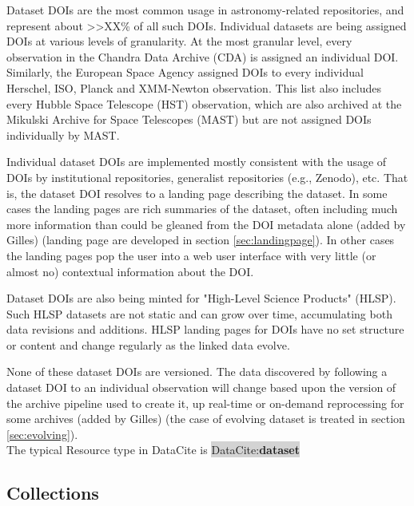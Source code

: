 \documentclass[11pt,a4paper]{ivoa}
\newcommand{\dataciteterm}[1]{\colorbox{lightgray}{DataCite:\textbf{#1}}}
\begin{document}
Dataset DOIs are the most common usage in astronomy-related repositories, and represent about >>XX\% of all such DOIs.
Individual datasets are being assigned DOIs at various levels of granularity. 
At the most granular level, every observation in the Chandra Data Archive (CDA) is assigned an individual DOI.
Similarly, the European Space Agency assigned DOIs to every individual Herschel, ISO, Planck and XMM-Newton observation. 
This list also includes every Hubble Space Telescope (HST) observation, which are also archived at the Mikulski Archive for Space Telescopes (MAST) but are not assigned DOIs individually by MAST.

Individual dataset DOIs are implemented mostly consistent with the usage of DOIs by institutional repositories, generalist repositories (e.g., Zenodo), etc.
That is, the dataset DOI resolves to a landing page describing the dataset.
In some cases the landing pages are rich summaries of the dataset, often including much more information than could be gleaned from the DOI metadata alone {\color{red}(added by Gilles) (landing page are developed in section \ref{sec:landingpage})}.
In other cases the landing pages pop the user into a web user interface with very little (or almost no) contextual information about the DOI. 

Dataset DOIs are also being minted for "High-Level Science Products" (HLSP). 
Such HLSP datasets are not static and can grow over time, accumulating both data revisions and additions.
HLSP landing pages for DOIs have no set structure or content and change regularly as the linked data evolve.

None of these dataset DOIs are versioned. 
The data discovered by following a dataset DOI to an individual observation will change based upon the version of the archive pipeline used to create it, up real-time or on-demand reprocessing for some archives {\color{red}(added by Gilles) (the case of evolving dataset is treated in section \ref{sec:evolving})}.\\

The typical Resource type in DataCite is \dataciteterm{dataset}

\subsection{Collections}
\label{sec:intro:collections}
\end{document}

